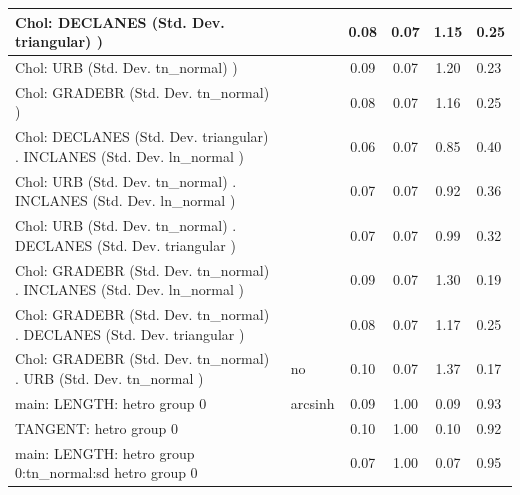 \begin{table}
\begin{center}
\begin{tabular}{|l|l|c|c|c|l|}
			\hline
			 Chol: DECLANES (Std. Dev. triangular) ) &  & 0.08 & 0.07 & 1.15 & 0.25 \\
			\hline
			 Chol: URB (Std. Dev. tn_normal) ) &  & 0.09 & 0.07 & 1.20 & 0.23 \\
			\hline
			 Chol: GRADEBR (Std. Dev. tn_normal) ) &  & 0.08 & 0.07 & 1.16 & 0.25 \\
			\hline
			 Chol: DECLANES (Std. Dev. triangular) . INCLANES (Std. Dev.   ln_normal ) &  & 0.06 & 0.07 & 0.85 & 0.40 \\
			\hline
			 Chol: URB (Std. Dev. tn_normal) . INCLANES (Std. Dev.   ln_normal ) &  & 0.07 & 0.07 & 0.92 & 0.36 \\
			\hline
			 Chol: URB (Std. Dev. tn_normal) . DECLANES (Std. Dev.   triangular ) &  & 0.07 & 0.07 & 0.99 & 0.32 \\
			\hline
			 Chol: GRADEBR (Std. Dev. tn_normal) . INCLANES (Std. Dev.   ln_normal ) &  & 0.09 & 0.07 & 1.30 & 0.19 \\
			\hline
			 Chol: GRADEBR (Std. Dev. tn_normal) . DECLANES (Std. Dev.   triangular ) &  & 0.08 & 0.07 & 1.17 & 0.25 \\
			\hline
			 Chol: GRADEBR (Std. Dev. tn_normal) . URB (Std. Dev.   tn_normal ) & no & 0.10 & 0.07 & 1.37 & 0.17 \\
			\hline
			main: LENGTH: hetro group 0 & arcsinh & 0.09 & 1.00 & 0.09 & 0.93 \\
			\hline
			TANGENT: hetro group 0 &  & 0.10 & 1.00 & 0.10 & 0.92 \\
			\hline
			main: LENGTH: hetro group 0:tn_normal:sd  hetro group 0 &  & 0.07 & 1.00 & 0.07 & 0.95 \\
			\hline
		\end{tabular}
	\end{center}
\end{table}